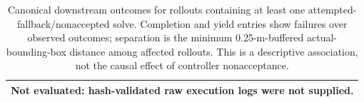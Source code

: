 \begin{table}[t]
\centering\scriptsize
\caption{Canonical downstream outcomes for rollouts containing at least one attempted-fallback/nonaccepted solve. Completion and yield entries show failures over observed outcomes; separation is the minimum 0.25-m-buffered actual-bounding-box distance among affected rollouts. This is a descriptive association, not the causal effect of controller nonacceptance.}
\label{tab:supervisor-feedback-failure-downstream}
\begin{tabular}{@{}l@{}}
\toprule
Not evaluated: hash-validated raw execution logs were not supplied. \\
\bottomrule
\end{tabular}
\end{table}
